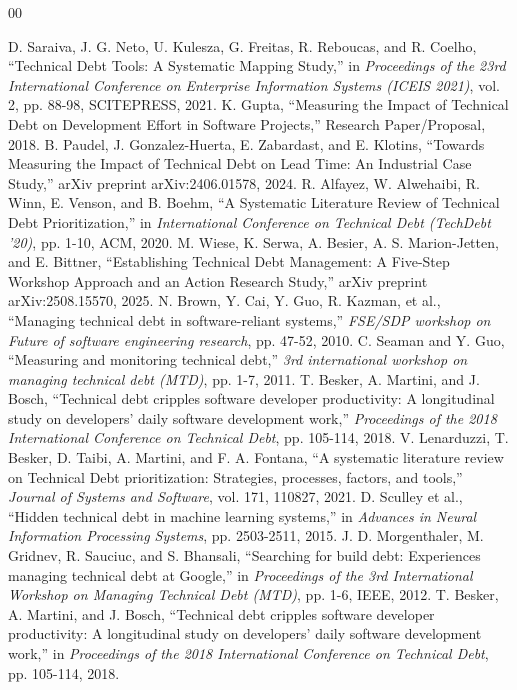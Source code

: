 \documentclass[conference]{IEEEtran}
\begin{document}
\begin{thebibliography}{00}

 D. Saraiva, J. G. Neto, U. Kulesza, G. Freitas, R. Reboucas, and R. Coelho, ``Technical Debt Tools: A Systematic Mapping Study,'' in \textit{Proceedings of the 23rd International Conference on Enterprise Information Systems (ICEIS 2021)}, vol. 2, pp. 88-98, SCITEPRESS, 2021.
 K. Gupta, ``Measuring the Impact of Technical Debt on Development Effort in Software Projects,'' Research Paper/Proposal, 2018.
 B. Paudel, J. Gonzalez-Huerta, E. Zabardast, and E. Klotins, ``Towards Measuring the Impact of Technical Debt on Lead Time: An Industrial Case Study,'' arXiv preprint arXiv:2406.01578, 2024.
 R. Alfayez, W. Alwehaibi, R. Winn, E. Venson, and B. Boehm, ``A Systematic Literature Review of Technical Debt Prioritization,'' in \textit{International Conference on Technical Debt (TechDebt '20)}, pp. 1-10, ACM, 2020.
 M. Wiese, K. Serwa, A. Besier, A. S. Marion-Jetten, and E. Bittner, ``Establishing Technical Debt Management: A Five-Step Workshop Approach and an Action Research Study,'' arXiv preprint arXiv:2508.15570, 2025.
 N. Brown, Y. Cai, Y. Guo, R. Kazman, et al., ``Managing technical debt in software-reliant systems,'' \textit{FSE/SDP workshop on Future of software engineering research}, pp. 47-52, 2010.
 C. Seaman and Y. Guo, ``Measuring and monitoring technical debt,'' \textit{3rd international workshop on managing technical debt (MTD)}, pp. 1-7, 2011.
 T. Besker, A. Martini, and J. Bosch, ``Technical debt cripples software developer productivity: A longitudinal study on developers’ daily software development work,'' \textit{Proceedings of the 2018 International Conference on Technical Debt}, pp. 105-114, 2018.
 V. Lenarduzzi, T. Besker, D. Taibi, A. Martini, and F. A. Fontana, ``A systematic literature review on Technical Debt prioritization: Strategies, processes, factors, and tools,'' \textit{Journal of Systems and Software}, vol. 171, 110827, 2021.
 D. Sculley et al., ``Hidden technical debt in machine learning systems,'' in \textit{Advances in Neural Information Processing Systems}, pp. 2503-2511, 2015.
 J. D. Morgenthaler, M. Gridnev, R. Sauciuc, and S. Bhansali, ``Searching for build debt: Experiences managing technical debt at Google,'' in \textit{Proceedings of the 3rd International Workshop on Managing Technical Debt (MTD)}, pp. 1-6, IEEE, 2012.
 T. Besker, A. Martini, and J. Bosch, ``Technical debt cripples software developer productivity: A longitudinal study on developers’ daily software development work,'' in \textit{Proceedings of the 2018 International Conference on Technical Debt}, pp. 105-114, 2018.

\end{thebibliography}
\end{document}
